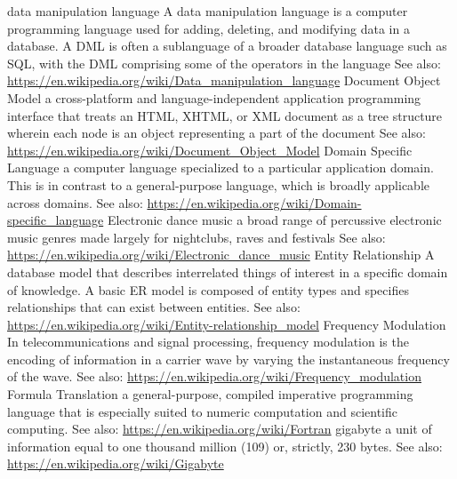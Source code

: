 	{data manipulation language}
	{A data manipulation language is a computer programming language used for adding, deleting, and modifying data in a database. A DML is often a sublanguage of a broader database language such as SQL, with the DML comprising some of the operators in the language See also: \url{https://en.wikipedia.org/wiki/Data_manipulation_language}}
	{Document Object Model}
	{a cross-platform and language-independent application programming interface that treats an HTML, XHTML, or XML document as a tree structure wherein each node is an object representing a part of the document See also: \url{https://en.wikipedia.org/wiki/Document_Object_Model}}
	{Domain Specific Language}
	{a computer language specialized to a particular application domain. This is in contrast to a general-purpose language, which is broadly applicable across domains. See also: \url{https://en.wikipedia.org/wiki/Domain-specific_language}}
	{Electronic dance music}
	{a broad range of percussive electronic music genres made largely for nightclubs, raves and festivals See also: \url{https://en.wikipedia.org/wiki/Electronic_dance_music}}
	{Entity Relationship}
	{A database model that describes interrelated things of interest in a specific domain of knowledge. A basic ER model is composed of entity types and specifies relationships that can exist between entities. See also: \url{https://en.wikipedia.org/wiki/Entity-relationship_model}}
	{Frequency Modulation}
	{In telecommunications and signal processing, frequency modulation is the encoding of information in a carrier wave by varying the instantaneous frequency of the wave.  See also: \url{https://en.wikipedia.org/wiki/Frequency_modulation}}
	{Formula Translation}
	{a general-purpose, compiled imperative programming language that is especially suited to numeric computation and scientific computing. See also: \url{https://en.wikipedia.org/wiki/Fortran}}
	{gigabyte}
	{a unit of information equal to one thousand million (109) or, strictly, 230 bytes. See also: \url{https://en.wikipedia.org/wiki/Gigabyte}}
